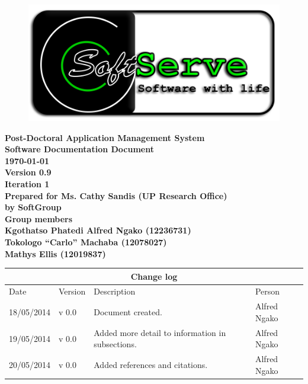 \documentclass[12pt]{article}
\newcommand{\Title}{Software Documentation Document} %
\newcommand{\ssr}{Soft\color{green}{Serve }\color{black}}
\newcommand{\version}{0.9}
\newcommand{\iteration}{1}
\newcommand{\client}{Ms. Cathy Sandis (UP Research Office)}
\newcommand{\project}{Post-Doctoral Application Management System}
\begin{document}
\vspace{4em}

\begin{center}%

\begin{figure}[ht!]
\centering
\includegraphics{../Images_Docs/logo.png}
\end{figure}
\LARGE \bf \project \\[1em]
\LARGE \bf \Title \\[0.25em]
\large \bf \today\\
\bf Version \version\\
\bf Iteration \iteration\\[0.5em]
\Large \bf Prepared for \client\\
\Large \bf by
\Large {\bf \ssr Group }\\[0.5em]
\LARGE {\bf Group members}\\[0.25em]
\large
Kgothatso Phatedi Alfred Ngako (12236731) \\[0.5em]
Tokologo “Carlo” Machaba (12078027) \\[0.5em]
Mathys Ellis (12019837) \\[8em]

\end{center}%


\begin{center}
\begin{tabular}{|l|p{1.4cm}|p{8cm}|p{2.8cm}|}
\hline
\multicolumn{4}{|c|}{\bf Change log} \\
\hline
 Date & Version & Description &  Person \\
\hline
18/05/2014 & v 0.0 & Document created. & Alfred Ngako \\
\hline
19/05/2014 & v 0.0 & Added more detail to information in subsections. & Alfred Ngako \\
\hline
20/05/2014 & v 0.0 & Added references and citations. & Alfred Ngako \\
\hline
\end{tabular}
\end{center}
\newpage
\tableofcontents
\end{document}
